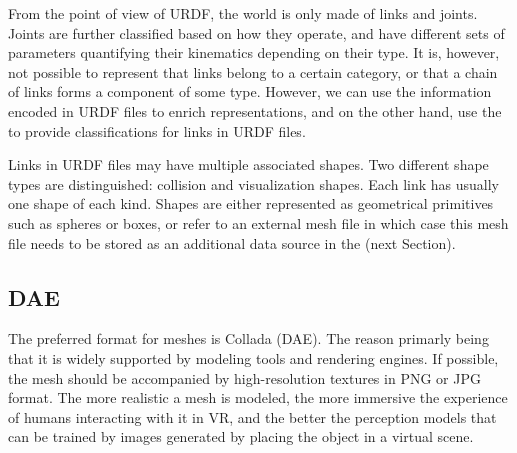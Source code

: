 From the point of view of URDF, the world is only made of links and joints.
Joints are further classified based on how they operate, and have different sets of parameters quantifying their kinematics depending on their type.
It is, however, not possible to represent that links belong to a certain category, or that a chain of links forms a component of some type.
However, we can use the information encoded in URDF files to enrich \neembak representations, and on the other hand, use the \neembak to provide classifications for links in URDF files.

Links in URDF files may have multiple associated shapes.
Two different shape types are distinguished: collision and visualization shapes.
Each link has usually one shape of each kind.
Shapes are either represented as geometrical primitives such as spheres or boxes, or refer to an external mesh file in which case this mesh file needs to be stored as an additional data source in the \neembak (next Section).

\subsection{DAE}
\label{sec:background:dae}

The preferred format for meshes is Collada (DAE).
The reason primarly being that it is widely supported by modeling tools and rendering engines.
If possible, the mesh should be accompanied by high-resolution textures in PNG or JPG format.
The more realistic a mesh is modeled, the more immersive the experience of humans interacting with it in VR, and the better the perception models that can be trained by images generated by placing the object in a virtual scene.

